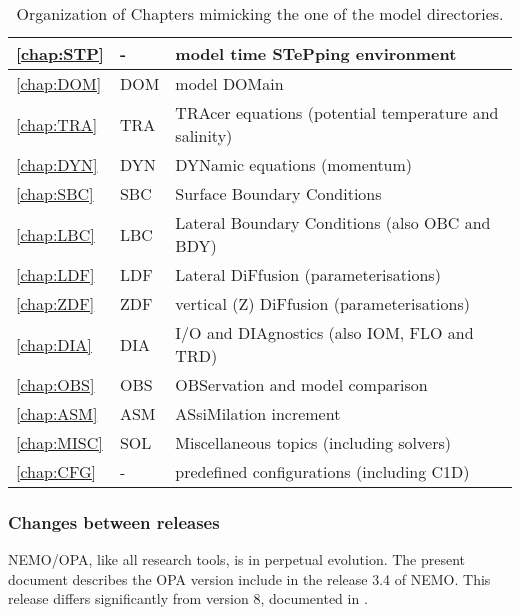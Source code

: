 \documentclass[../main/NEMO_manual]{subfiles}
\begin{document}
\begin{table}[!t]	
  \caption{ \protect\label{tab:chap}   Organization of Chapters mimicking the one of the model directories. }
  \begin{center}
    \begin{tabular}{|l|l|l|}	\hline
      \autoref{chap:STP}	& -   		        & model time STePping environment \\		\hline
      \autoref{chap:DOM}	& DOM		& model DOMain \\		\hline
      \autoref{chap:TRA}	& TRA		& TRAcer equations (potential temperature and salinity) \\   \hline
      \autoref{chap:DYN}	& DYN		& DYNamic equations (momentum) \\		\hline
      \autoref{chap:SBC} 	& SBC		& Surface Boundary Conditions \\			\hline
      \autoref{chap:LBC}	& LBC		& Lateral Boundary Conditions (also OBC and BDY)  \\ 		\hline
      \autoref{chap:LDF}	& LDF		& Lateral DiFfusion (parameterisations) \\	\hline
      \autoref{chap:ZDF}	& ZDF		& vertical (Z) DiFfusion (parameterisations)  \\		\hline
      \autoref{chap:DIA}	& DIA		& I/O and DIAgnostics (also IOM, FLO and TRD) \\		\hline
      \autoref{chap:OBS}	& OBS		& OBServation and model comparison  \\		\hline
      \autoref{chap:ASM}	& ASM		& ASsiMilation increment  \\		\hline
      \autoref{chap:MISC}	& SOL		& Miscellaneous  topics (including solvers)  \\       \hline
      \autoref{chap:CFG}	&  - 			& predefined configurations (including C1D) \\		\hline
    \end{tabular}
  \end{center}
\end{table}


\subsubsection{Changes between releases}
NEMO/OPA, like all research tools, is in perpetual evolution.
The present document describes the OPA version include in the release 3.4 of NEMO.
This release differs significantly from version 8, documented in \citet{Madec1998}.\\
\end{document}
